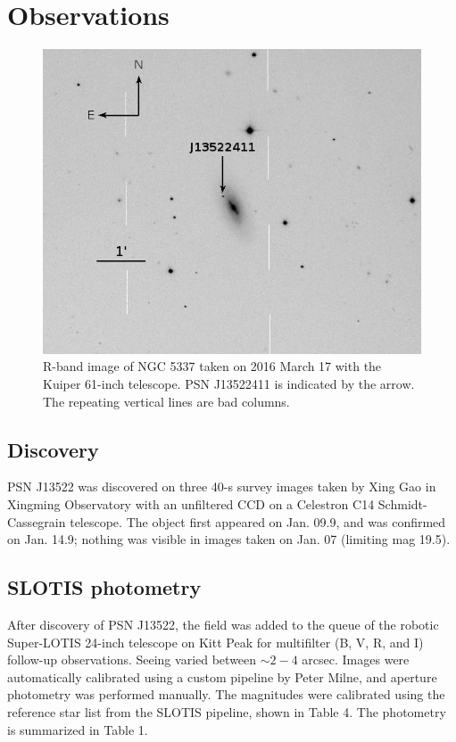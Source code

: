 \documentclass[iop]{emulateapj}
\begin{document}
\section{Observations} \label{obs}

\begin{figure}
  \includegraphics[width=\linewidth]{graphics/Kuiper_R.jpeg}
  \caption{R-band image of NGC 5337 taken on 2016 March 17 with the Kuiper 61-inch telescope. PSN J13522411 is indicated by the arrow. The repeating vertical lines are bad columns.}
  \label{fig:kuiper}
\end{figure}

\subsection{Discovery} \label{obs:disc}
PSN J13522 was discovered on three 40-s survey images taken by Xing Gao in Xingming Observatory with an unfiltered CCD on a Celestron C14 Schmidt-Cassegrain telescope. The object first appeared on Jan. 09.9, and was confirmed on Jan. 14.9; nothing was visible in images taken on Jan. 07 (limiting mag 19.5).

\subsection{SLOTIS photometry} \label{obs:slotis}
After discovery of PSN J13522, the field was added to the queue of the robotic Super-LOTIS 24-inch telescope \citep[SLOTIS;][]{Wil08} on Kitt Peak for multifilter (B, V, R, and I) follow-up observations. Seeing varied between $\sim2-4$ arcsec. Images were automatically calibrated using a custom pipeline by Peter Milne, and aperture photometry was performed manually. The magnitudes were calibrated using the reference star list from the SLOTIS pipeline, shown in Table 4. The photometry is summarized in Table 1.
\end{document}

